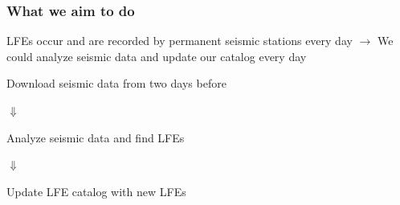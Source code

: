 \documentclass{beamer}
\begin{document}
	\begin{frame}
		\frametitle{What we aim to do}
		LFEs occur and are recorded by permanent seismic stations every day $\rightarrow$ We could analyze seismic data and update our catalog every day

		\vspace{5mm}

		\begin{exampleblock}{}
		\centering
		\normalsize{
		Download seismic data from two days before
		}
		\end{exampleblock}

		\centering
		\Huge{
		$\Downarrow$
		}

		\begin{exampleblock}{}
		\centering
		\normalsize{
		Analyze seismic data and find LFEs
		}
		\end{exampleblock}

		\centering
		\Huge{
		$\Downarrow$
		}

		\begin{exampleblock}{}
		\centering
		\normalsize{
		Update LFE catalog with new LFEs
		}
		\end{exampleblock}
	\end{frame}
\end{document}
